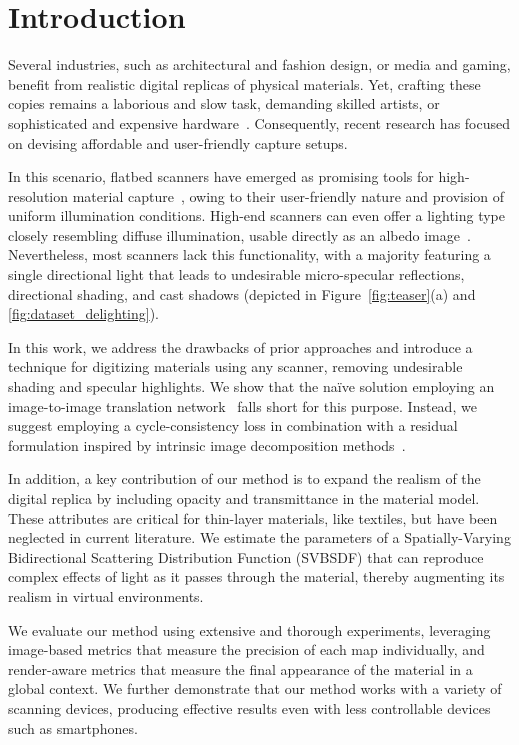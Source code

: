 \section{Introduction}
\label{sec:introduction}


Several industries, such as architectural and fashion design, or media and gaming, benefit from realistic digital replicas of physical materials. Yet, crafting these copies remains a laborious and slow task, demanding skilled artists, or sophisticated and expensive hardware~\cite{garces2023towards,TAC7}. Consequently, recent research has focused on devising affordable and user-friendly capture setups.

In this scenario, flatbed scanners have emerged as promising tools for high-resolution material capture~\cite{rodriguezpardo2023UMat}, owing to their user-friendly nature and provision of uniform illumination conditions. High-end scanners can even offer a lighting type closely resembling diffuse illumination, usable directly as an albedo image~\cite{rodriguezpardo2023UMat}. Nevertheless, most scanners lack this functionality, with a majority featuring a single directional light that leads to undesirable micro-specular reflections, directional shading, and cast shadows (depicted in Figure~\ref{fig:teaser}(a) and \ref{fig:dataset_delighting}).

In this work, we address the drawbacks of prior approaches and introduce a technique for digitizing materials using any scanner, removing undesirable shading and specular highlights. We show that the na\"ive solution employing an image-to-image translation network~\cite{martin2019lighting, rodriguezpardo2023UMat} falls short for this purpose. Instead, we suggest employing a cycle-consistency loss in combination with a residual formulation inspired by intrinsic image decomposition methods~\cite{garces2022survey}.

In addition, a key contribution of our method is to expand the realism of the digital replica by including opacity and transmittance in the material model. These attributes are critical for thin-layer materials, like textiles, but have been neglected in current literature. We estimate the parameters of a Spatially-Varying Bidirectional Scattering Distribution Function (SVBSDF) that can reproduce complex effects of light as it passes through the material, thereby augmenting its realism in virtual environments.

We evaluate our method using extensive and thorough experiments, leveraging image-based metrics that measure the precision of each map individually, and render-aware metrics that measure the final appearance of the material in a global context. We further demonstrate that our method works with a variety of scanning devices, producing effective results even with less controllable devices such as smartphones. 




